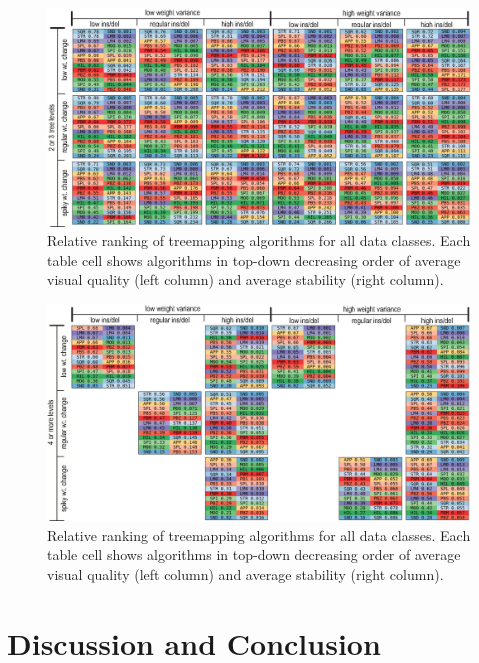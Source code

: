 \begin{figure}
\centering
\includegraphics[width=\linewidth]{figures/treemap-evaluation/table-b.png}
\caption{Relative ranking of treemapping algorithms for all data classes. Each table cell shows algorithms in top-down decreasing order of average visual quality (left column) and average stability (right column).}
\label{fig:rankingtable-b}
\end{figure}

\begin{figure}
\centering
\includegraphics[width=\linewidth]{figures/treemap-evaluation/table-c.png}
\caption{Relative ranking of treemapping algorithms for all data classes. Each table cell shows algorithms in top-down decreasing order of average visual quality (left column) and average stability (right column).}
\label{fig:rankingtable-c}
\end{figure}


\section{Discussion and Conclusion}
\label{sec:discussion-2}

